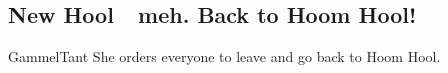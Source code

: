 \vspace{30mm}


\vspace{30mm}








\subsection*{New Hool~\mdash~meh. Back to Hoom Hool!}

GammelTant
She orders everyone to leave and go back to Hoom Hool.




\vspace{50mm}



